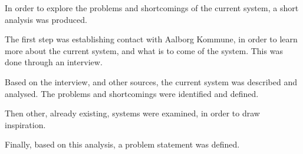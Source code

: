 In order to explore the problems and shortcomings of the current \citybike system, a short analysis was produced.

The first step was establishing contact with Aalborg Kommune, in order to learn more about the current system, and what is to come of the system.
This was done through an interview.

Based on the interview, and other sources, the current system was described and analysed.
The problems and shortcomings were identified and defined.

Then other, already existing, systems were examined, in order to draw inspiration.

Finally, based on this analysis, a problem statement was defined.